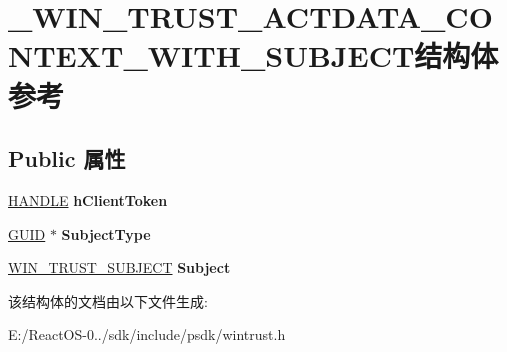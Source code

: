 \hypertarget{struct___w_i_n___t_r_u_s_t___a_c_t_d_a_t_a___c_o_n_t_e_x_t___w_i_t_h___s_u_b_j_e_c_t}{}\section{\+\_\+\+W\+I\+N\+\_\+\+T\+R\+U\+S\+T\+\_\+\+A\+C\+T\+D\+A\+T\+A\+\_\+\+C\+O\+N\+T\+E\+X\+T\+\_\+\+W\+I\+T\+H\+\_\+\+S\+U\+B\+J\+E\+C\+T结构体 参考}
\label{struct___w_i_n___t_r_u_s_t___a_c_t_d_a_t_a___c_o_n_t_e_x_t___w_i_t_h___s_u_b_j_e_c_t}
\subsection*{Public 属性}
\begin{DoxyCompactItemize}
\item 
\mbox{\label{struct___w_i_n___t_r_u_s_t___a_c_t_d_a_t_a___c_o_n_t_e_x_t___w_i_t_h___s_u_b_j_e_c_t_a9071cfa6ba2fc303359271664520ac41}} 
\hyperlink{interfacevoid}{H\+A\+N\+D\+LE} {\bfseries h\+Client\+Token}
\item 
\mbox{\label{struct___w_i_n___t_r_u_s_t___a_c_t_d_a_t_a___c_o_n_t_e_x_t___w_i_t_h___s_u_b_j_e_c_t_adb8a24cba206d7e738003a2737fe7e80}} 
\hyperlink{interface_g_u_i_d}{G\+U\+ID} $\ast$ {\bfseries Subject\+Type}
\item 
\mbox{\label{struct___w_i_n___t_r_u_s_t___a_c_t_d_a_t_a___c_o_n_t_e_x_t___w_i_t_h___s_u_b_j_e_c_t_afc10e4cf712ae13e512bc027773fb1dc}} 
\hyperlink{interfacevoid}{W\+I\+N\+\_\+\+T\+R\+U\+S\+T\+\_\+\+S\+U\+B\+J\+E\+CT} {\bfseries Subject}
\end{DoxyCompactItemize}


该结构体的文档由以下文件生成\+:\begin{DoxyCompactItemize}
\item 
E\+:/\+React\+O\+S-\/0../sdk/include/psdk/wintrust.\+h\end{DoxyCompactItemize}
